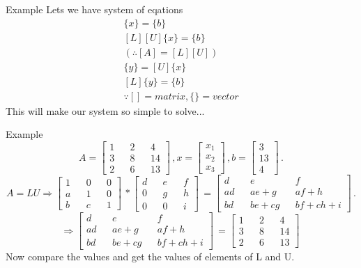 \documentclass{beamer}
\begin{document}
\begin{frame}{Example}
Lets we have system of eqations
\begin{align*}
  [A]\{x\} = \{b\}\\
  	[L][U]\{x\} = \{b\}\\
  	(\therefore [A] = [L][U])\\
  \{y\} = [U]\{x\}\\
  [L]\{y\} = \{b\}\\
  \because []=matrix, \{\}=vector
\end{align*}
This will make our system so simple to solve...
\end{frame}

\begin{frame}{Example}
\begin{equation*}
A = \left[ \begin{aligned}
1 && 2 && 4 \\
3 && 8 && 14 \\
2 && 6 && 13
\end{aligned}
\right]\,,
x = \left[ \begin{aligned}
x_1\\
x_2\\
x_3
\end{aligned}
\right]\,,
b = \left[ \begin{aligned}
3\\
13\\
4
\end{aligned}
\right]\,.
\end{equation*}
\begin{equation*}
A= LU \Rightarrow \left[ \begin{aligned}
1 && 0 && 0 \\
a && 1 && 0 \\
b && c && 1
\end{aligned}
\right]\,*
\left[ \begin{aligned}
d && e && f \\
0 && g && h \\
0 && 0 && i
\end{aligned}
\right]\,=
\left[ \begin{aligned}
d && e && f \\
ad && ae+g && af+h \\
bd && be+cg && bf+ch+i
\end{aligned}
\right]\,.
\end{equation*}
\begin{equation*}
\Rightarrow
\left[ \begin{aligned}
d && e && f \\
ad && ae+g && af+h \\
bd && be+cg && bf+ch+i
\end{aligned}
\right]\,=
\left[ \begin{aligned}
1 && 2 && 4 \\
3 && 8 && 14 \\
2 && 6 && 13
\end{aligned}
\right]\,
\end{equation*}
Now compare the values and get the values of elements of L and U.
\end{frame}
\end{document}
